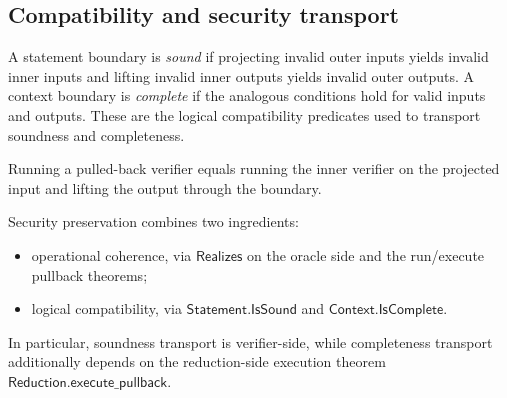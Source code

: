 \subsection{Compatibility and security transport}

\begin{definition}
  \label{int:boundary-compatibility}
A statement boundary is \emph{sound} if projecting invalid outer inputs yields
invalid inner inputs and lifting invalid inner outputs yields invalid outer
outputs.  A context boundary is \emph{complete} if the analogous conditions
  hold for valid inputs and outputs.  These are the logical compatibility
  predicates used to transport soundness and completeness.
\end{definition}

\begin{theorem}
  \label{thm:verifier-run-pullback}
  Running a pulled-back verifier equals running the inner verifier on the
  projected input and lifting the output through the boundary.
\end{theorem}

Security preservation combines two ingredients:
\begin{itemize}
  \item operational coherence, via $\mathsf{Realizes}$ on the oracle side and
    the run/execute pullback theorems;
  \item logical compatibility, via $\mathsf{Statement.IsSound}$ and
    $\mathsf{Context.IsComplete}$.
\end{itemize}
In particular, soundness transport is verifier-side, while completeness
transport additionally depends on the reduction-side execution theorem
$\mathsf{Reduction.execute\_pullback}$.
